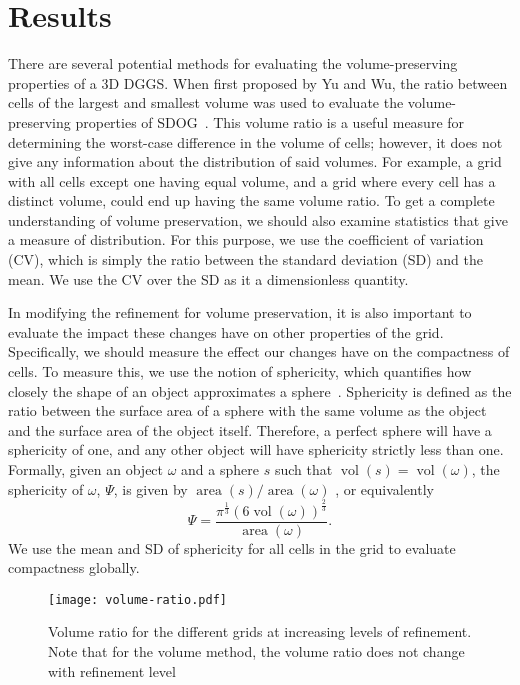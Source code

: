 \section{Results} \label{chap:4:results}
There are several potential methods for evaluating the volume-preserving properties of a 3D DGGS.
When first proposed by Yu and Wu, the ratio between cells of the largest and smallest volume was used to evaluate the volume-preserving properties of SDOG~\cite{yu2009sdog}.
This volume ratio is a useful measure for determining the worst-case difference in the volume of cells; however, it does not give any information about the distribution of said volumes.
For example, a grid with all cells except one having equal volume, and a grid where every cell has a distinct volume, could end up having the same volume ratio.
To get a complete understanding of volume preservation, we should also examine statistics that give a measure of distribution.
For this purpose, we use the coefficient of variation (CV), which is simply the ratio between the standard deviation (SD) and the mean.
We use the CV over the SD as it a dimensionless quantity.


In modifying the refinement for volume preservation, it is also important to evaluate the impact these changes have on other properties of the grid.
Specifically, we should measure the effect our changes have on the compactness of cells.
To measure this, we use the notion of sphericity, which quantifies how closely the shape of an object approximates a sphere~\cite{wadell1935volume}.
Sphericity is defined as the ratio between the surface area of a sphere with the same volume as the object and the surface area of the object itself.
Therefore, a perfect sphere will have a sphericity of one, and any other object will have sphericity strictly less than one.
Formally, given an object $\omega$ and a sphere $s$ such that $\operatorname{vol}(s) = \operatorname{vol}(\omega)$, the sphericity of $\omega$, $\Psi$, is given by $\operatorname{area}(s) / \operatorname{area}(\omega)$ , or equivalently 
%
\begin{equation*}
\Psi = \frac{\pi^{\frac{1}{3}}\left( 6\operatorname{vol}(\omega) \right)^{\frac{2}{3}}}{\operatorname{area}(\omega)}.
\end{equation*}
%
We use the mean and SD of sphericity for all cells in the grid to evaluate compactness globally.

\begin{figure}[p!]
	\centering
	\texttt{[image: volume-ratio.pdf]}
	\caption[Graph of volume ratio for the different grids]{
		Volume ratio for the different grids at increasing levels of refinement.
		Note that for the volume method, the volume ratio does not change with refinement level
	}
	\label{fig:vr}
\end{figure}



